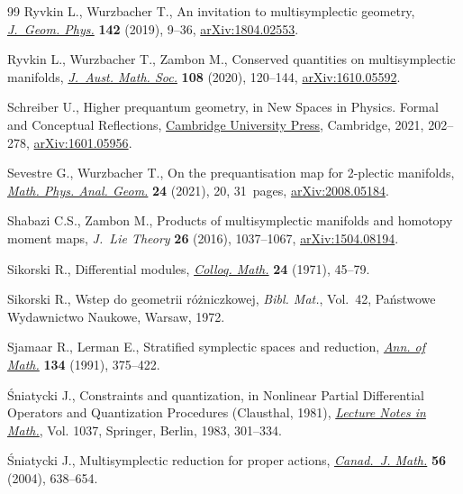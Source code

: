 \begin{thebibliography}{99}
Ryvkin L., Wurzbacher T., An invitation to multisymplectic geometry,
  \href{https://doi.org/10.1016/j.geomphys.2019.03.006}{\textit{J.~Geom. Phys.}} \textbf{142} (2019), 9--36, \href{https://arxiv.org/abs/1804.02553}{arXiv:1804.02553}.

Ryvkin L., Wurzbacher T., Zambon M., Conserved quantities on multisymplectic
  manifolds, \href{https://doi.org/10.1017/s1446788718000381}{\textit{J.~Aust. Math. Soc.}} \textbf{108} (2020), 120--144,
  \href{https://arxiv.org/abs/1610.05592}{arXiv:1610.05592}.

Schreiber U., Higher prequantum geometry, in New Spaces in Physics. Formal and
  Conceptual Reflections, \href{https://doi.org/10.1017/9781108854399.008}{Cambridge University Press}, Cambridge, 2021,
  202--278, \href{https://arxiv.org/abs/1601.05956}{arXiv:1601.05956}.

Sevestre G., Wurzbacher T., On the prequantisation map for 2-plectic manifolds,
  \href{https://doi.org/10.1007/s11040-021-09391-5}{\textit{Math. Phys. Anal. Geom.}} \textbf{24} (2021), 20, 31~pages,
  \href{https://arxiv.org/abs/2008.05184}{arXiv:2008.05184}.

Shabazi C.S., Zambon M., Products of multisymplectic manifolds and homotopy
  moment maps, \textit{J.~Lie Theory} \textbf{26} (2016), 1037--1067,
  \href{https://arxiv.org/abs/1504.08194}{arXiv:1504.08194}.

Sikorski R., Differential modules, \href{https://doi.org/10.4064/cm-24-1-45-79}{\textit{Colloq. Math.}} \textbf{24} (1971),
  45--79.

Sikorski R., Wstep do geometrii r\'o\.zniczkowej, \textit{Bibl. Mat.}, Vol.~42,
  Pa\'nstwowe Wydawnictwo Naukowe, Warsaw, 1972.

Sjamaar R., Lerman E., Stratified symplectic spaces and reduction, \href{https://doi.org/10.2307/2944350}{\textit{Ann.
  of Math.}} \textbf{134} (1991), 375--422.

\'Sniatycki J., Constraints and quantization, in Nonlinear Partial Differential
  Operators and Quantization Procedures ({C}lausthal, 1981), \href{https://doi.org/10.1007/BFb0073178}{\textit{Lecture
  Notes in Math.}}, Vol. 1037, Springer, Berlin, 1983, 301--334.

\'Sniatycki J., Multisymplectic reduction for proper actions, \href{https://doi.org/10.4153/CJM-2004-029-8}{\textit{Canad.~J.
  Math.}} \textbf{56} (2004), 638--654.


\end{thebibliography}
